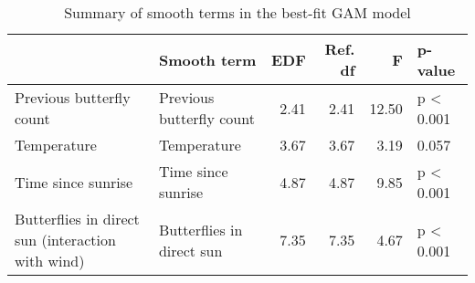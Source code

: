 \begin{table}

\caption{\label{tab:export-smooth-terms-table}Summary of smooth terms in the best-fit GAM model}
\centering
\begin{tabular}[t]{llrrrl}
\toprule
  & Smooth term & EDF & Ref. df & F & p-value\\
\midrule
Previous butterfly count & Previous butterfly count & 2.41 & 2.41 & 12.50 & p < 0.001\\
Temperature & Temperature & 3.67 & 3.67 & 3.19 & 0.057\\
Time since sunrise & Time since sunrise & 4.87 & 4.87 & 9.85 & p < 0.001\\
Butterflies in direct sun (interaction with wind) & Butterflies in direct sun & 7.35 & 7.35 & 4.67 & p < 0.001\\
\bottomrule
\end{tabular}
\end{table}
